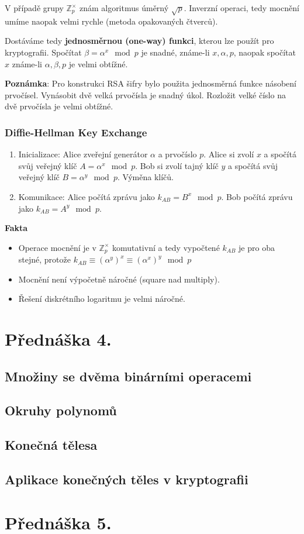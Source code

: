 \documentclass[12pt, letterpaper]{article}
\begin{document}
V případě grupy $\mathbb{Z}^\times_p$ znám algoritmus úměrný $\sqrt{p}$.
Inverzní operaci, tedy mocnění umíme naopak velmi rychle (metoda opakovaných čtverců).

Dostáváme tedy \textbf{jednosměrnou (one-way) funkci}, kterou lze použít pro kryptografii.
Spočítat $\beta = \alpha^x \mod p$ je snadné, známe-li $x, \alpha, p$,
naopak spočítat $x$ známe-li $\alpha, \beta, p$ je velmi obtížné.

\textbf{Poznámka}: Pro konstrukci RSA šifry bylo použita jednosměrná funkce násobení prvočísel.
Vynásobit dvě velká prvočísla je snadný úkol. Rozložit velké číslo na dvě prvočísla je velmi obtížné.

\subsubsection*{Diffie-Hellman Key Exchange}
\begin{enumerate}
    \item Inicializace:
    \subitem Alice zveřejní generátor $\alpha$ a prvočíslo $p$.
    \subitem Alice si zvolí $x$ a spočítá svůj veřejný klíč $A = \alpha^x \mod p$.
    \subitem Bob si zvolí tajný klíč $y$ a spočítá svůj veřejný klíč $B = \alpha^y \mod p$.
    \subitem Výměna klíčů.
    \item Komunikace:
    \subitem Alice počítá zprávu jako $k_{AB} = B^x \mod p$.
    \subitem Bob počítá zprávu jako $k_{AB} = A^y \mod p$.
\end{enumerate}

\textbf{Fakta}
\begin{itemize}
    \item Operace mocnění je v $\mathbb{Z}^\times_p$ komutativní
     a tedy vypočtené $k_{AB}$ je pro oba stejné, protože $k_{AB} \equiv \left( \alpha^{y} \right)^x \equiv \left( \alpha^{x} \right)^y \mod p$
    \item Mocnění není výpočetně náročné (square nad multiply).
    \item Řešení diskrétního logaritmu je velmi náročné.
\end{itemize}


\section{Přednáška 4.}

\subsection{Množiny se dvěma binárními operacemi}

\subsection{Okruhy polynomů}

\subsection{Konečná tělesa}

\subsection{Aplikace konečných těles v kryptografii}

\section{Přednáška 5.}
\end{document}
